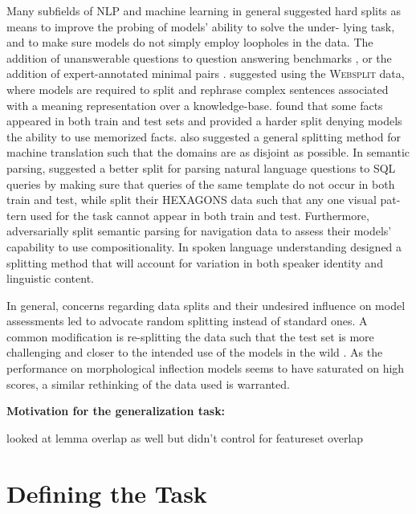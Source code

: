 \documentclass[11pt]{article}
\begin{document}
Many subfields of NLP and machine learning in general suggested hard splits as means to improve the probing of models’ ability to solve the under- lying task, and to make sure models do not simply employ loopholes in the data.
The addition of unanswerable questions to question answering benchmarks \citep{rajpurkar-etal-2018-know}, or the addition of expert-annotated minimal pairs \citep{gardner-etal-2020-evaluating}. 
\citet{narayan-etal-2017-split} suggested using the \textsc{Websplit} data, where models are required to split and rephrase complex sentences associated with a meaning representation over a knowledge-base. 
\citet{aharoni-goldberg-2018-split} found that some facts appeared in both train and test sets and provided a harder split denying models the ability to use memorized facts. \citet{aharoni-goldberg-2020-unsupervised} also suggested a general splitting method for machine translation such that the domains are as disjoint as possible.
In semantic parsing, \citet{finegan-dollak-etal-2018-improving} suggested a better split for parsing natural language questions to SQL queries by making sure that queries of the same template do not occur in both train and test, while \citet{lachmy2022} split their HEXAGONS data such that any one visual pat- tern used for the task cannot appear in both train and test. 
Furthermore, \citet{loula-etal-2018-rearranging} adversarially split semantic parsing for navigation data to assess their models’ capability to use compositionality. In spoken language understanding \citet{arora2021} designed a splitting method that will account for variation in both speaker identity and linguistic content.



In general, concerns regarding data splits and their undesired influence on model assessments led \citet{gorman-bedrick-2019-need} to advocate random splitting instead of standard ones.
A common modification is re-splitting the data such that the test set is more challenging and closer to the intended use of the models in the wild \citep{sogaard-etal-2021-need}. As the performance on morphological inflection models seems to have saturated on high scores, a similar rethinking of the data used is warranted.

\textbf{Motivation for the generalization task:} 

\citet{pimentel-ryskina-etal-2021-sigmorphon} looked at lemma overlap as well but didn't control for featureset overlap 

\newpage
\section{Defining the Task}
\end{document}
